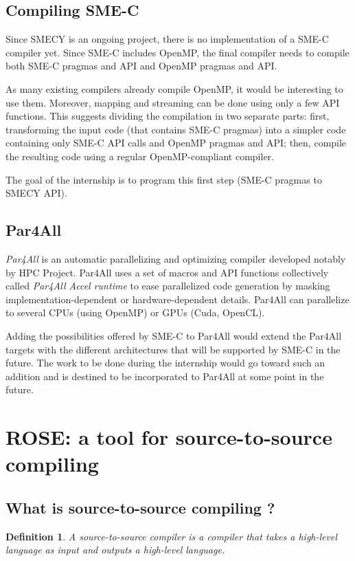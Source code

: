 \documentclass[a4paper]{article}
\newtheorem{defdef}{Definition}
\begin{document}
	\subsection{Compiling SME-C}
	Since SMECY is an ongoing project, there is no implementation of a SME-C compiler yet. Since SME-C includes OpenMP, the final compiler needs to compile both SME-C pragmas and API and OpenMP pragmas and API.
	
	As many existing compilers already compile OpenMP, it would be interesting to use them. Moreover, mapping and streaming can be done using only a few API functions. This suggests dividing the compilation in two separate parts: first, transforming the input code (that contains SME-C pragmas) into a simpler code containing only SME-C API calls and OpenMP pragmas and API; then, compile the resulting code using a regular OpenMP-compliant compiler.

	The goal of the internship is to program this first step (SME-C pragmas to SMECY API).
	
	\subsection{Par4All}
	\emph{Par4All} is an automatic parallelizing and optimizing compiler
    developed notably by HPC Project. Par4All uses a set of macros and API
    functions collectively called \emph{Par4All Accel runtime} to ease
    parallelized code generation by masking implementation-dependent or
    hardware-dependent details. Par4All can parallelize to several CPUs
    (using OpenMP) or GPUs (Cuda, OpenCL).

	Adding the possibilities offered by SME-C to Par4All would extend the Par4All targets with the different architectures that will be supported by SME-C in the future. The work to be done during the internship would go toward such an addition and is destined to be incorporated to Par4All at some point in the future.

\section{ROSE: a tool for source-to-source compiling}
	\subsection{What is source-to-source compiling ?}
	\begin{defdef}A \emph{source-to-source compiler} is a compiler that takes a high-level language as input and outputs a high-level language.
	\end{defdef}
	
\end{document}
